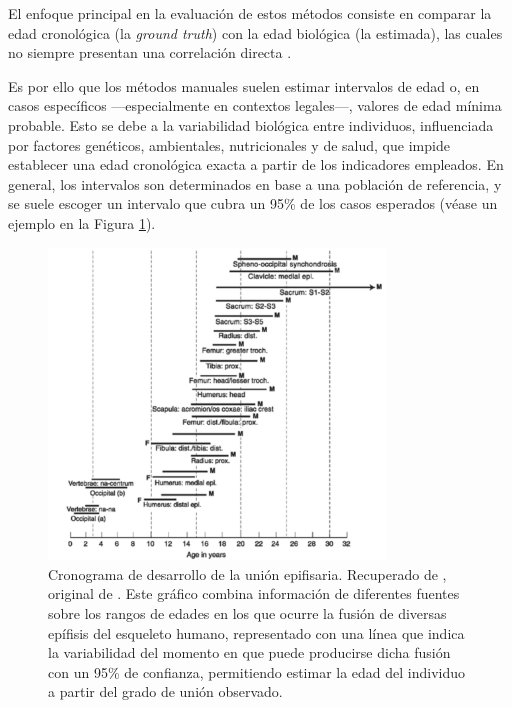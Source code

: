 El enfoque principal en la evaluación de estos métodos consiste en comparar la edad cronológica (la \textit{ground truth}) con la edad biológica (la estimada), las cuales no siempre presentan una correlación directa \cite{marquez2015}.

Es por ello que los métodos manuales suelen estimar intervalos de edad o, en casos específicos ---especialmente en contextos legales---, valores de edad mínima probable. Esto se debe a la variabilidad biológica entre individuos, influenciada por factores genéticos, ambientales, nutricionales y de salud, que impide establecer una edad cronológica exacta a partir de los indicadores empleados. En general, los intervalos son determinados en base a una población de referencia, y se suele escoger un intervalo que cubra un 95\% de los casos esperados \cite{garvin2012} (véase un ejemplo en la Figura \ref{fig:range_values_epiphyselial}).

\begin{figure}[h]
    \centering
    \includegraphics[width=0.8\textwidth]{capitulos/cap_03/imagenes/range_values_epiphyselial.png}
    \caption[
        Cronograma de desarrollo de la unión epifisaria. 
    ]{
        Cronograma de desarrollo de la unión epifisaria. 
        Recuperado de \cite{byers2023}, original de \cite{buikstra1994}. 
        Este gráfico combina información de diferentes fuentes sobre los rangos de edades en los que ocurre la fusión de diversas epífisis del esqueleto humano, representado con una línea que indica la variabilidad del momento en que puede producirse dicha fusión con un 95\% de confianza, permitiendo estimar la edad del individuo a partir del grado de unión observado.
    }
    \label{fig:range_values_epiphyselial}
\end{figure}

